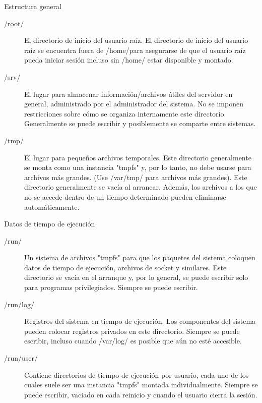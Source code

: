 \begin{frame}[c]{Estructura general}
  \begin{description}
    \item [/root/] El directorio de inicio del usuario raíz. El directorio de
			inicio del usuario raíz se encuentra fuera de /home/para asegurarse de
			que el usuario raíz pueda iniciar sesión incluso sin /home/ estar
			disponible y montado.
    \pausa
    \item [/srv/] El lugar para almacenar información/archivos útiles del
			servidor en general, administrado por el administrador del sistema.
			No se imponen restricciones sobre cómo se organiza internamente este
			directorio. Generalmente se puede escribir y posiblemente se comparte
			entre sistemas.
    \pausa
    \item [/tmp/] El lugar para pequeños archivos temporales. Este directorio
			generalmente se monta como una instancia "tmpfs" y, por lo tanto, no
			debe usarse para archivos más grandes. (Use /var/tmp/ para archivos más
			grandes). Este directorio generalmente se vacía al arrancar. Además, los
			archivos a los que no se accede dentro de un tiempo determinado pueden
			eliminarse automáticamente.
  \end{description}
\end{frame}

\begin{frame}[c]{Datos de tiempo de ejecución}
  \begin{description}
    \item [/run/] Un sistema de archivos "tmpfs" para que los paquetes del
			sistema coloquen datos de tiempo de ejecución, archivos de socket y
			similares. Este directorio se vacía en el arranque y, por lo general,
			se puede escribir solo para programas privilegiados. Siempre se
			puede escribir.
    \pausa
    \item [/run/log/] Registros del sistema en tiempo de ejecución. Los
			componentes del sistema pueden colocar registros privados en este
			directorio. Siempre se puede escribir, incluso cuando /var/log/ es
			posible que aún no esté accesible.
    \pausa
    \item [/run/user/] Contiene directorios de tiempo de ejecución por
			usuario, cada uno de los cuales suele ser una instancia "tmpfs" montada
			individualmente. Siempre se puede escribir, vaciado en cada reinicio y
			cuando el usuario cierra la sesión.
  \end{description}
\end{frame}

